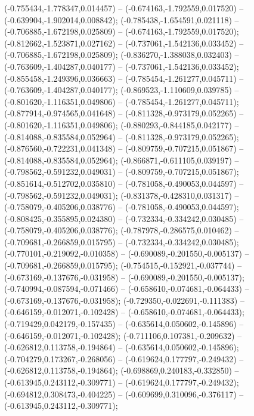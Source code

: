  (-0.755434,-1.778347,0.014457) -- (-0.674163,-1.792559,0.017520) -- (-0.639904,-1.902014,0.008842);
 (-0.785438,-1.654591,0.021118) -- (-0.706885,-1.672198,0.025809) -- (-0.674163,-1.792559,0.017520);
 (-0.812662,-1.523871,0.027162) -- (-0.737061,-1.542136,0.033452) -- (-0.706885,-1.672198,0.025809);
 (-0.836270,-1.388038,0.032403) -- (-0.763609,-1.404287,0.040177) -- (-0.737061,-1.542136,0.033452);
 (-0.855458,-1.249396,0.036663) -- (-0.785454,-1.261277,0.045711) -- (-0.763609,-1.404287,0.040177);
 (-0.869523,-1.110609,0.039785) -- (-0.801620,-1.116351,0.049806) -- (-0.785454,-1.261277,0.045711);
 (-0.877914,-0.974565,0.041648) -- (-0.811328,-0.973179,0.052265) -- (-0.801620,-1.116351,0.049806);
 (-0.880293,-0.844185,0.042177) -- (-0.814088,-0.835584,0.052964) -- (-0.811328,-0.973179,0.052265);
 (-0.876560,-0.722231,0.041348) -- (-0.809759,-0.707215,0.051867) -- (-0.814088,-0.835584,0.052964);
 (-0.866871,-0.611105,0.039197) -- (-0.798562,-0.591232,0.049031) -- (-0.809759,-0.707215,0.051867);
 (-0.851614,-0.512702,0.035810) -- (-0.781058,-0.490053,0.044597) -- (-0.798562,-0.591232,0.049031);
 (-0.831378,-0.428310,0.031317) -- (-0.758079,-0.405206,0.038776) -- (-0.781058,-0.490053,0.044597);
 (-0.808425,-0.355895,0.024380) -- (-0.732334,-0.334242,0.030485) -- (-0.758079,-0.405206,0.038776);
 (-0.787978,-0.286575,0.010462) -- (-0.709681,-0.266859,0.015795) -- (-0.732334,-0.334242,0.030485);
 (-0.770101,-0.219092,-0.010358) -- (-0.690089,-0.201550,-0.005137) -- (-0.709681,-0.266859,0.015795);
 (-0.754515,-0.152921,-0.037744) -- (-0.673169,-0.137676,-0.031958) -- (-0.690089,-0.201550,-0.005137);
 (-0.740994,-0.087594,-0.071466) -- (-0.658610,-0.074681,-0.064433) -- (-0.673169,-0.137676,-0.031958);
 (-0.729350,-0.022691,-0.111383) -- (-0.646159,-0.012071,-0.102428) -- (-0.658610,-0.074681,-0.064433);
 (-0.719429,0.042179,-0.157435) -- (-0.635614,0.050602,-0.145896) -- (-0.646159,-0.012071,-0.102428);
 (-0.711106,0.107381,-0.209632) -- (-0.626812,0.113758,-0.194864) -- (-0.635614,0.050602,-0.145896);
 (-0.704279,0.173267,-0.268056) -- (-0.619624,0.177797,-0.249432) -- (-0.626812,0.113758,-0.194864);
 (-0.698869,0.240183,-0.332850) -- (-0.613945,0.243112,-0.309771) -- (-0.619624,0.177797,-0.249432);
 (-0.694812,0.308473,-0.404225) -- (-0.609699,0.310096,-0.376117) -- (-0.613945,0.243112,-0.309771);
